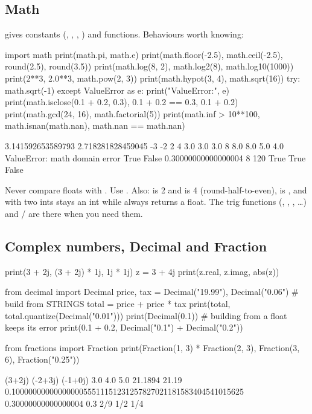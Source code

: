 \subsection{Math}

 gives constants (, , , ) and functions.
Behaviours worth knowing:

\begin{pycode}
import math
print(math.pi, math.e)
print(math.floor(-2.5), math.ceil(-2.5), round(2.5), round(3.5))
print(math.log(8, 2), math.log2(8), math.log10(1000))
print(2**3, 2.0**3, math.pow(2, 3))
print(math.hypot(3, 4), math.sqrt(16))
try:
    math.sqrt(-1)
except ValueError as e:
    print("ValueError:", e)
print(math.isclose(0.1 + 0.2, 0.3), 0.1 + 0.2 == 0.3, 0.1 + 0.2)
print(math.gcd(24, 16), math.factorial(5))
print(math.inf > 10**100, math.isnan(math.nan), math.nan == math.nan)
\end{pycode}
\begin{rawcode}
3.141592653589793 2.718281828459045
-3 -2 2 4
3.0 3.0 3.0
8 8.0 8.0
5.0 4.0
ValueError: math domain error
True False 0.30000000000000004
8 120
True True False
\end{rawcode}

\begin{trap}
Never compare floats with \code{==}. Use . Also:  is 2 and
 is 4 (round-half-to-even),  is , and \code{**} with two
ints stays an int while  always returns a float. The trig functions (,
, , \dots) and / are there when you need them.
\end{trap}

\subsection{Complex numbers, Decimal and Fraction}

\begin{pycode}
print(3 + 2j, (3 + 2j) * 1j, 1j * 1j)
z = 3 + 4j
print(z.real, z.imag, abs(z))

from decimal import Decimal
price, tax = Decimal("19.99"), Decimal("0.06")      # build from STRINGS
total = price + price * tax
print(total, total.quantize(Decimal("0.01")))
print(Decimal(0.1))                  # building from a float keeps its error
print(0.1 + 0.2, Decimal("0.1") + Decimal("0.2"))

from fractions import Fraction
print(Fraction(1, 3) * Fraction(2, 3), Fraction(3, 6), Fraction("0.25"))
\end{pycode}
\begin{rawcode}
(3+2j) (-2+3j) (-1+0j)
3.0 4.0 5.0
21.1894 21.19
0.1000000000000000055511151231257827021181583404541015625
0.30000000000000004 0.3
2/9 1/2 1/4
\end{rawcode}

